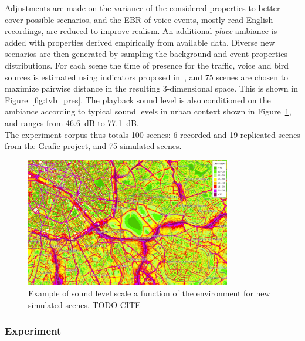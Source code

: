 \documentclass[11pt,a4paper]{article}
\begin{document}
Adjustments are made on the variance of the considered properties to better cover possible scenarios, and the EBR of voice events, mostly read English recordings, are reduced to improve realism. An additional \textit{place} ambiance is added with properties derived empirically from available data. Diverse new scenarios are then generated by sampling the background and event properties distributions. For each scene the time of presence for the traffic, voice and bird sources is estimated using indicators proposed in~\cite{gontier2018}, and 75 scenes are chosen to maximize pairwise distance in the resulting 3-dimensional space. This is shown in Figure~\ref{fig:tvb_pres}. The playback sound level is also conditioned on the ambiance according to typical sound levels in urban context shown in Figure~\ref{fig:amb_levels}, and ranges from 46.6~dB to 77.1~dB.\\

The experiment corpus thus totals 100 scenes: 6 recorded and 19 replicated scenes from the Grafic project, and 75 simulated scenes.

\begin{figure}[!h]
    \centering
    \includegraphics[width=0.8\textwidth]{figures/lvls.jpg}
    \caption{Example of sound level scale a function of the environment for new simulated scenes. TODO CITE}\label{fig:amb_levels}
\end{figure}


\subsubsection{Experiment}
\label{sec:pval_exp}
\end{document}

